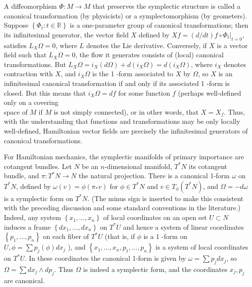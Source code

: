 \documentclass[10pt, letterpaper]{article}
\begin{document}
A diffeomorphism $\Phi: M \rightarrow M$ that preserves the symplectic structure is called a canonical transformation (by physicists) or a symplectomorphism (by geometers). Suppose $\left\{\Phi_{t}: t \in \mathbb{R}\right\}$ is a one-parameter group of canonical transformations; then its infinitesimal generator, the vector field $X$ defined by $X f=\left.(d / d t) f \circ \Phi_{t}\right|_{t=0}$, satisfies $L_{X} \Omega=0$, where $L$ denotes the Lie derivative. Conversely, if $X$ is a vector field such that $L_{X} \Omega=0$, the flow it generates consists of (local) canonical transformations. But $L_{X} \Omega=i_{X}(d \Omega)+d\left(i_{X} \Omega\right)=d\left(i_{X} \Omega\right)$, where $i_{X}$ denotes contraction with $X$, and $i_{X} \Omega$ is the 1 -form associated to $X$ by $\Omega$, so $X$ is an infinitesimal canonical transformation if and only if its associated 1 -form is closed. But this means that $i_{X} \Omega=d f$ for some function $f$ (perhaps well-defined only on a covering\\
space of $M$ if $M$ is not simply connected), or in other words, that $X=X_{f}$. Thus, with the understanding that functions and transformations may be only locally well-defined, Hamiltonian vector fields are precisely the infinitesimal generators of canonical transformations.

For Hamiltonian mechanics, the symplectic manifolds of primary importance are cotangent bundles. Let $N$ be an $n$-dimensional manifold, $T^{*} N$ its cotangent bundle, and $\pi: T^{*} N \rightarrow N$ the natural projection. There is a canonical 1-form $\omega$ on $T^{*} N$, defined by $\omega(v)=\phi\left(\pi_{*} v\right)$ for $\phi \in T^{*} N$ and $v \in T_{\phi}\left(T^{*} N\right)$, and $\Omega=-d \omega$ is a symplectic form on $T^{*} N$. (The minus sign is inserted to make this consistent with the preceding discussion and some standard conventions in the literature.) Indeed, any system $\left\{x_{1}, \ldots, x_{n}\right\}$ of local coordinates on an open set $U \subset N$ induces a frame $\left\{d x_{1}, \ldots, d x_{n}\right\}$ on $T^{*} U$ and hence a system of linear coordinates $\left\{p_{1}, \ldots, p_{n}\right\}$ on each fiber of $T^{*} U$ (that is, if $\phi$ is a 1 -form on $U, \phi=\sum p_{j}(\phi) d x_{j}$ ), and $\left\{x_{1}, \ldots, x_{n}, p_{1}, \ldots, p_{n}\right\}$ is a system of local coordinates on $T^{*} U$. In these coordinates the canonical 1-form is given by $\omega=\sum p_{j} d x_{j}$, so $\Omega=\sum d x_{j} \wedge d p_{j}$. Thus $\Omega$ is indeed a symplectic form, and the coordinates $x_{j}, p_{j}$ are canonical.
\end{document}
